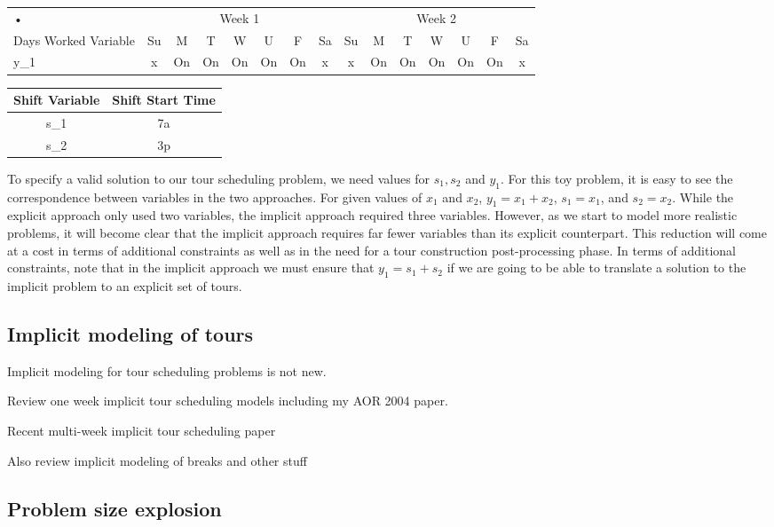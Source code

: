 \documentclass{article}
\begin{document}
\begin{tabular}{|l|c|c|c|c|c|c|c|c|c|c|c|c|c|c|}
\hline 
• & \multicolumn{7}{c|}{Week 1} & \multicolumn{7}{c|}{Week 2} \\  
Days Worked Variable & Su & M & T & W & U & F & Sa & Su & M & T & W & U & F & Sa \\ 
\hline 
y_1 & x & On & On & On & On & On & x & x & On & On & On & On & On & x \\  
\hline 
\end{tabular}

\begin{tabular}{|c|c|}
\hline 
Shift Variable & Shift Start Time \\ 
\hline 
s_1 & 7a \\ 
\hline 
s_2 & 3p \\ 
\hline 
\end{tabular}

To specify a valid solution to our tour scheduling problem, we need values for $s_1, s_2$ and $y_1$. For this toy problem, it is easy to see the correspondence between variables in the two approaches. For given values of $x_1$ and $x_2$, $y_1 = x_1 + x_2$, $s_1 = x_1$, and $s_2 = x_2$. While the explicit approach only used two variables, the implicit approach required three variables. However, as we start to model more realistic problems, it will become clear that the implicit approach requires far fewer variables than its explicit counterpart. This reduction will come at a cost in terms of additional constraints as well as in the need for a tour construction post-processing phase. In terms of additional constraints, note that in the implicit approach we must ensure that $y_1 = s_1 + s_2$ if we are going to be able to translate a solution to the implicit problem to an explicit set of tours.

\subsection{Implicit modeling of tours}

Implicit modeling for tour scheduling problems is not new. 

Review one week implicit tour scheduling models including my AOR 2004 paper.

Recent multi-week implicit tour scheduling paper

Also review implicit modeling of breaks and other stuff

\subsection{Problem size explosion}
\label{subsec-explosion}
\end{document}
